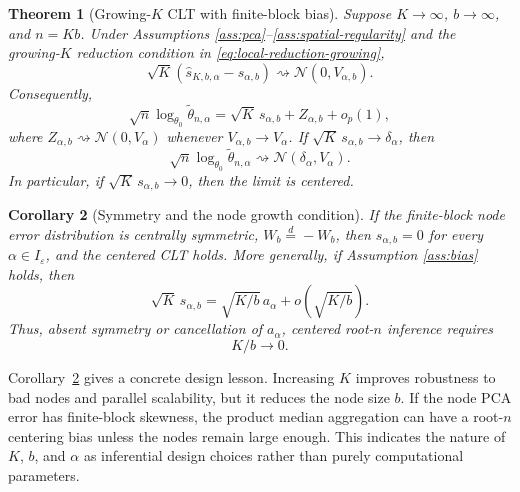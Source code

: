 \documentclass[11pt]{article}
\newtheorem{theorem}{Theorem}
\newtheorem{corollary}[theorem]{Corollary}
\newcommand{\dto}{\rightsquigarrow}
\newcommand{\Normal}{\mathcal N}
\newcommand{\eps}{\varepsilon}
\begin{document}
\begin{theorem}[Growing-\(K\) CLT with finite-block bias]\label{thm:growing-K}
Suppose \(K\to\infty\), \(b\to\infty\), and \(n=Kb\).  Under Assumptions \ref{ass:pca}--\ref{ass:spatial-regularity} and the growing-\(K\) reduction condition in \eqref{eq:local-reduction-growing},
\begin{equation}\label{eq:spatial-clt-finite-b}
    \sqrt K\left(\widehat s_{K,b,\alpha}-s_{\alpha,b}\right)
    \dto \Normal(0,V_{\alpha,b}).
\end{equation}
Consequently,
\begin{equation}\label{eq:mom-bias-expansion}
    \sqrt n\log_{\theta_0}\widetilde\theta_{n,\alpha}
    =\sqrt K\,s_{\alpha,b}+Z_{\alpha,b}+o_p(1),
\end{equation}
where \(Z_{\alpha,b}\dto\Normal(0,V_\alpha)\) whenever \(V_{\alpha,b}\to V_\alpha\).  If \(\sqrt K\,s_{\alpha,b}\to\delta_\alpha\), then
\begin{equation}\label{eq:growing-K-limit}
    \sqrt n\log_{\theta_0}\widetilde\theta_{n,\alpha}
    \dto \Normal(\delta_\alpha,V_\alpha).
\end{equation}
In particular, if \(\sqrt K\,s_{\alpha,b}\to0\), then the limit is centered.
\end{theorem}

\begin{corollary}[Symmetry and the node growth condition]\label{cor:symmetry-Kb}
If the finite-block node error distribution is centrally symmetric, \(W_b\stackrel d=-W_b\), then \(s_{\alpha,b}=0\) for every \(\alpha\in I_\eps\), and the centered CLT holds.  More generally, if Assumption \ref{ass:bias} holds, then
\[
    \sqrt K\,s_{\alpha,b}=\sqrt{K/b}\,a_\alpha+o(\sqrt{K/b}).
\]
Thus, absent symmetry or cancellation of \(a_\alpha\), centered root-\(n\) inference requires
\begin{equation}\label{eq:K-over-b}
    K/b\to0.
\end{equation}
\end{corollary}

Corollary~\ref{cor:symmetry-Kb} gives a concrete design lesson.  Increasing \(K\) improves robustness to bad nodes and parallel scalability, but it reduces the node size \(b\).  If the node PCA error has finite-block skewness, the product median aggregation can have a root-\(n\) centering bias unless the nodes remain large enough.  This indicates the nature of \(K\), \(b\), and \(\alpha\) as inferential design choices rather than purely computational parameters.
\end{document}
